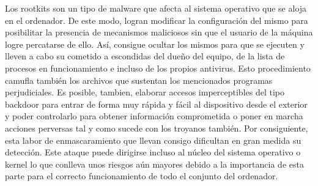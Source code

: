 Los rootkits son un tipo de malware que afecta al sistema operativo que se aloja en el ordenador. De este modo, logran modificar la configuración del mismo para posibilitar la presencia de mecanismos maliciosos sin que el usuario de la máquina logre percatarse de ello. Así, consigue ocultar los mismos para que se ejecuten y lleven a cabo su cometido a escondidas del dueño del equipo, de la lista de procesos en funcionamiento e incluso de los propios antivirus. Esto procedimiento camufla también los archivos que sustentan los mencionados programas perjudiciales. Es posible, tambien, elaborar accesos imperceptibles del tipo backdoor para entrar de forma muy rápida y fácil al dispositivo desde el exterior y poder controlarlo para obtener información comprometida o poner en marcha acciones perversas tal y como sucede con los troyanos también. Por consiguiente, esta labor de enmascaramiento que llevan consigo dificultan en gran medida su detección. Este ataque puede dirigirse incluso al núcleo del sistema operativo o kernel lo que conlleva unos riesgos aún mayores debido a la importancia de esta parte para el correcto funcionamiento de todo el conjunto del ordenador.